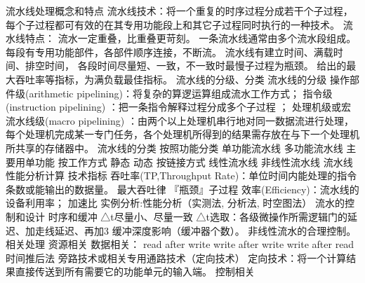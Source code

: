 \documentclass{ctexart}
\begin{document}
\begin{outline}
    \1 流水线处理概念和特点
        \2 流水线技术：将一个重复的时序过程分成若干个子过程，每个子过程都可有效的在其专用功能段上和其它子过程同时执行的一种技术。 
        \2 流水线特点：
            \3 流水一定重叠，比重叠更苛刻。
            \3 一条流水线通常由多个流水段组成。
            \3 每段有专用功能部件，各部件顺序连接，不断流。
            \3 流水线有建立时间、满载时间、排空时间，
            \3 各段时间尽量短、一致，不一致时最慢子过程为瓶颈。
            \3 给出的最大吞吐率等指标，为满负载最佳指标。
    \1 流水线的分级、分类
        \2 流水线的分级
            \3 操作部件级(arithmetic pipelining)：将复杂的算逻运算组成流水工作方式； 
            \3 指令级(instruction pipelining) ：把一条指令解释过程分成多个子过程 ；
            \3 处理机级或宏流水线级(macro pipelining) ：由两个以上处理机串行地对同一数据流进行处理，每个处理机完成某一专门任务，各个处理机所得到的结果需存放在与下一个处理机所共享的存储器中。 
        \2 流水线的分类
            \3 按照功能分类
                \4 单功能流水线
                \4 多功能流水线
                \4 主要用单功能
            \3 按工作方式
                \4 静态
                \4 动态
            \3 按链接方式
                \4 线性流水线
                \4 非线性流水线
    \1 流水线性能分析计算
        \2 技术指标
            \3 吞吐率(TP,Throughput Rate)：单位时间内能处理的指令条数或能输出的数据量。
                \4 最大吞吐律
                \4 『瓶颈』子过程
            \3 效率(Efficiency)：流水线的设备利用率；
            \3 加速比
        \2 实例分析:性能分析（实测法,  分析法,  时空图法）
    \1 流水的控制和设计
        \2 时序和缓冲
            \3 △t尽量小、尽量一致
            \3 △t选取：各级微操作所需逻辑门的延迟、加走线延迟、再加3%
            \3 缓冲深度影响（缓冲器个数）。
            \3 非线性流水的合理控制。
        \2 相关处理
            \3 资源相关
            \3 数据相关：
                \4 read after write
                \4 write after write
                \4 write after read
                \4 时间推后法
                \4 旁路技术或相关专用通路技术（定向技术）
                \4 定向技术：将一个计算结果直接传送到所有需要它的功能单元的输入端。
            \3 控制相关

\end{outline}
\end{document}

